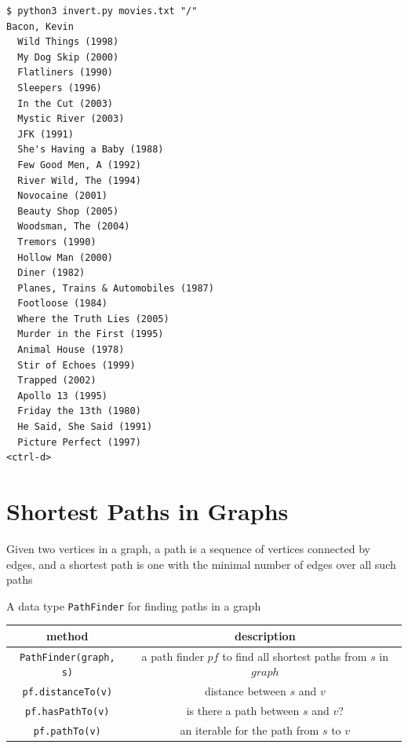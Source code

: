 \documentclass[8pt,a4paper,compress]{beamer}
\begin{document}
\begin{frame}[fragile]
\pause

\begin{lstlisting}[language={},style=focusin]
$ python3 invert.py movies.txt "/"
Bacon, Kevin
  Wild Things (1998)
  My Dog Skip (2000)
  Flatliners (1990)
  Sleepers (1996)
  In the Cut (2003)
  Mystic River (2003)
  JFK (1991)
  She's Having a Baby (1988)
  Few Good Men, A (1992)
  River Wild, The (1994)
  Novocaine (2001)
  Beauty Shop (2005)
  Woodsman, The (2004)
  Tremors (1990)
  Hollow Man (2000)
  Diner (1982)
  Planes, Trains & Automobiles (1987)
  Footloose (1984)
  Where the Truth Lies (2005)
  Murder in the First (1995)
  Animal House (1978)
  Stir of Echoes (1999)
  Trapped (2002)
  Apollo 13 (1995)
  Friday the 13th (1980)
  He Said, She Said (1991)
  Picture Perfect (1997)
<ctrl-d>
\end{lstlisting}
\end{frame}

\section{Shortest Paths in Graphs}
\begin{frame}[fragile]
\pause

Given two vertices in a graph, a path is a sequence of vertices connected by edges, and a shortest path is one with the minimal number of edges over all such paths

\pause
\bigskip

A data type \lstinline{PathFinder} for finding paths in a graph
\begin{center}
\begin{tabular}{cc}
method & description \\ \hline
\lstinline$PathFinder(graph, s)$ & a path finder $pf$ to find all shortest paths from $s$ in $graph$ \\
\lstinline$pf.distanceTo(v)$ & distance between $s$ and $v$ \\
\lstinline$pf.hasPathTo(v)$ & is there a path between $s$ and $v$? \\
\lstinline$pf.pathTo(v)$ & an iterable for the path from $s$ to $v$
\end{tabular} 
\end{center}
\end{frame}
\end{document}
